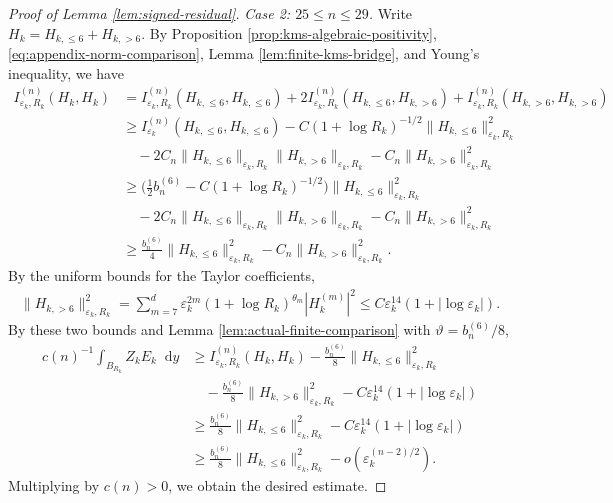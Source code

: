 \documentclass[11pt]{article}
\numberwithin{equation}{section}
\theoremstyle{remark}
\newcommand{\dd}{\mathop{}\!\mathrm{d}}
\begin{document}
\begin{proof}[Proof of Lemma  \ref{lem:signed-residual}]
 \emph{Case  2: $25\le n\le29$.}  
Write $H_k=H_{k,\le6}+H_{k,>6}$.  By
Proposition  \ref{prop:kms-algebraic-positivity},
\eqref{eq:appendix-norm-comparison},
Lemma  \ref{lem:finite-kms-bridge}, and Young's inequality, we have
{
\begin{align*}
 I_{\varepsilon_k,R_k}^{(n)}(H_k,H_k)
 &=I_{\varepsilon_k,R_k}^{(n)}(H_{k,\le6},H_{k,\le6})
 +2I_{\varepsilon_k,R_k}^{(n)}(H_{k,\le6},H_{k,>6})
 +I_{\varepsilon_k,R_k}^{(n)}(H_{k,>6},H_{k,>6})\\
 &\ge I_{\varepsilon_k}^{(n)}(H_{k,\le6},H_{k,\le6})
 -C(1+\log R_k)^{-1/2}
       \|H_{k,\le6}\|_{\varepsilon_k,R_k}^2\\
 &\quad-2C_n\|H_{k,\le6}\|_{\varepsilon_k,R_k}
          \|H_{k,>6}\|_{\varepsilon_k,R_k}
 -C_n\|H_{k,>6}\|_{\varepsilon_k,R_k}^2\\
 &\ge \bigl(\tfrac12b_n^{(6)}-C(1+\log R_k)^{-1/2}\bigr)
       \|H_{k,\le6}\|_{\varepsilon_k,R_k}^2\\
 &\quad-2C_n\|H_{k,\le6}\|_{\varepsilon_k,R_k}
          \|H_{k,>6}\|_{\varepsilon_k,R_k}
 -C_n\|H_{k,>6}\|_{\varepsilon_k,R_k}^2\\
 &\ge \frac{b_n^{(6)}}4
       \|H_{k,\le6}\|_{\varepsilon_k,R_k}^2
 -C_n\|H_{k,>6}\|_{\varepsilon_k,R_k}^2.
\end{align*}
}
 {By the uniform bounds for the Taylor coefficients,}
{
\[
\begin{aligned}
 \|H_{k,>6}\|_{\varepsilon_k,R_k}^2
 =\sum_{m=7}^d
       \varepsilon_k^{2m}(1+\log R_k)^{\theta_m}
       |H_k^{(m)}|^2
 \le C\varepsilon_k^{14}(1+|\log\varepsilon_k|).
\end{aligned}
\]
}
 By these two bounds and Lemma  \ref{lem:actual-finite-comparison} with
$\vartheta=b_n^{(6)}/8$,
{
\begin{align*}
 c(n)^{-1}\int_{B_{R_k}}Z_kE_k\dd y
 &\ge I_{\varepsilon_k,R_k}^{(n)}(H_k,H_k)
 -\frac{b_n^{(6)}}8
       \|H_{k,\le6}\|_{\varepsilon_k,R_k}^2\\
 &\quad-\frac{b_n^{(6)}}8
       \|H_{k,>6}\|_{\varepsilon_k,R_k}^2
 -C\varepsilon_k^{14}(1+|\log\varepsilon_k|)\\
 &\ge \frac{b_n^{(6)}}8
       \|H_{k,\le6}\|_{\varepsilon_k,R_k}^2
 -C\varepsilon_k^{14}(1+|\log\varepsilon_k|)\\
 &\ge \frac{b_n^{(6)}}8
       \|H_{k,\le6}\|_{\varepsilon_k,R_k}^2
 -o(\varepsilon_k^{(n-2)/2}).
\end{align*}
}
Multiplying by $c(n)>0$, we obtain the desired estimate.
\end{proof}
\end{document}
